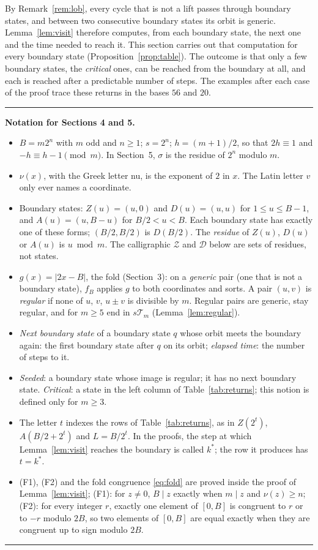 \documentclass[11pt]{amsart}
\theoremstyle{definition}
\theoremstyle{remark}
\newcommand{\T}{\mathcal{T}}
\newcommand{\Zs}{\mathcal{Z}}
\newcommand{\Ds}{\mathcal{D}}
\newcommand{\vt}{\nu}
\begin{document}
By Remark~\ref{rem:lob}, every cycle that is not a lift passes through boundary states, and between two consecutive boundary states its orbit is generic. Lemma~\ref{lem:visit} therefore computes, from each boundary state, the next one and the time needed to reach it. This section carries out that computation for every boundary state (Proposition~\ref{prop:table}). The outcome is that only a few boundary states, the \emph{critical} ones, can be reached from the boundary at all, and each is reached after a predictable number of steps. The examples after each case of the proof trace these returns in the bases $56$ and $20$.

\medskip
\noindent\rule{\linewidth}{0.4pt}\par\nopagebreak
\noindent\textbf{Notation for Sections 4 and 5.}\par\nopagebreak
{\small
\begin{itemize}
\item $B=m2^n$ with $m$ odd and $n\ge1$; $s=2^n$; $h=(m+1)/2$, so that $2h\equiv1$ and $-h\equiv h-1\pmod m$. In Section~5, $\sigma$ is the residue of $2^n$ modulo $m$.
\item $\vt(x)$, with the Greek letter nu, is the exponent of $2$ in $x$. The Latin letter $v$ only ever names a coordinate.
\item Boundary states: $Z(u)=(u,0)$ and $D(u)=(u,u)$ for $1\le u\le B-1$, and $A(u)=(u,B-u)$ for $B/2<u<B$. Each boundary state has exactly one of these forms; $(B/2,B/2)$ is $D(B/2)$. The \emph{residue} of $Z(u)$, $D(u)$ or $A(u)$ is $u\bmod m$. The calligraphic $\Zs$ and $\Ds$ below are sets of residues, not states.
\item $g(x)=|2x-B|$, the fold (Section~3): on a \emph{generic} pair (one that is not a boundary state), $f_B$ applies $g$ to both coordinates and sorts. A pair $(u,v)$ is \emph{regular} if none of $u$, $v$, $u\pm v$ is divisible by $m$. Regular pairs are generic, stay regular, and for $m\ge5$ end in $s\T_m$ (Lemma~\ref{lem:regular}).
\item \emph{Next boundary state} of a boundary state $q$ whose orbit meets the boundary again: the first boundary state after $q$ on its orbit; \emph{elapsed time}: the number of steps to it.
\item \emph{Seeded}: a boundary state whose image is regular; it has no next boundary state. \emph{Critical}: a state in the left column of Table~\ref{tab:returns}; this notion is defined only for $m\ge3$.
\item The letter $t$ indexes the rows of Table~\ref{tab:returns}, as in $Z(2^t)$, $A(B/2+2^t)$ and $L=B/2^t$. In the proofs, the step at which Lemma~\ref{lem:visit} reaches the boundary is called $k^*$; the row it produces has $t=k^*$.
\item (F1), (F2) and the fold congruence \eqref{eq:fold} are proved inside the proof of Lemma~\ref{lem:visit}; (F1): for $z\ne0$, $B\mid z$ exactly when $m\mid z$ and $\vt(z)\ge n$; (F2): for every integer $r$, exactly one element of $[0,B]$ is congruent to $r$ or to $-r$ modulo $2B$, so two elements of $[0,B]$ are equal exactly when they are congruent up to sign modulo $2B$.
\end{itemize}}
\noindent\rule{\linewidth}{0.4pt}
\medskip
\end{document}
